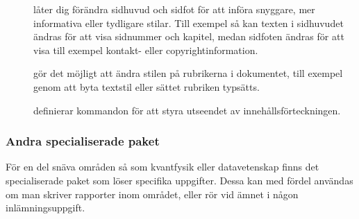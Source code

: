 \documentclass[lang=sv,ptsize=10pt,font=none,nomath,titles=bf,../../a4.tex]{subfiles}
\begin{document}
\begin{description}
	\item[]
	låter dig förändra sidhuvud och sidfot för att införa snyggare, mer
	informativa eller tydligare stilar. Till exempel så kan texten i
	sidhuvudet ändras för att visa sidnummer och kapitel, medan sidfoten
	ändras för att visa till exempel kontakt- eller copyrightinformation.
	
	\item[]
	gör det möjligt att ändra stilen på rubrikerna i dokumentet, till
	exempel genom att byta textstil eller sättet rubriken typsätts.

	\item[]
	definierar kommandon för att styra utseendet av
	innehållsförteckningen.
\end{description}

\subsubsection{Andra specialiserade paket}
För en del snäva områden så som kvantfysik eller datavetenskap finns det
specialiserade paket som löser specifika uppgifter. Dessa kan med fördel
användas om man skriver rapporter inom området, eller rör vid ämnet i
någon inlämningsuppgift.
\end{document}
